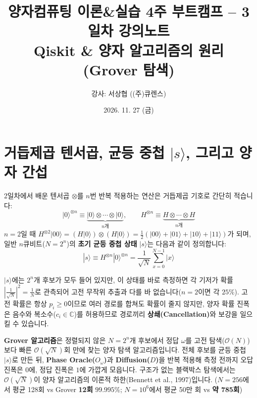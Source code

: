\documentclass[11pt, a4paper]{article}
\title{\textbf{양자컴퓨팅 이론\&실습 4주 부트캠프 -- 3일차 강의노트}\\
\large Qiskit \& 양자 알고리즘의 원리 (Grover 탐색)}
\author{강사: 서상협 ((주)큐렌스)}
\date{2026. 11. 27 (금)}
\newcommand{\ket}[1]{|#1\rangle}
\theoremstyle{definition}
\begin{document}
\maketitle
\tableofcontents
\vspace{0.5cm}

\section{거듭제곱 텐서곱, 균등 중첩 \texorpdfstring{$\ket{s}$}{|s>}, 그리고 양자 간섭}
2일차에서 배운 텐서곱 $\otimes$를 $n$번 반복 적용하는 연산은 거듭제곱 기호로 간단히 적습니다:
$$\ket{0}^{\otimes n} \equiv \underbrace{\ket{0}\otimes\cdots\otimes\ket{0}}_{n\text{개}}, \qquad H^{\otimes n} \equiv \underbrace{H\otimes\cdots\otimes H}_{n\text{개}}$$
$n=2$일 때 $H^{\otimes 2}\ket{00} = (H\ket{0})\otimes(H\ket{0}) = \frac{1}{2}(\ket{00}+\ket{01}+\ket{10}+\ket{11})$가 되며, 일반 $n$큐비트($N=2^n$)의 \textbf{초기 균등 중첩 상태} $\ket{s}$는 다음과 같이 정의합니다:
$$\ket{s} \equiv H^{\otimes n}\ket{0}^{\otimes n} = \frac{1}{\sqrt{N}}\sum_{x=0}^{N-1}\ket{x}$$

$\ket{s}$에는 $2^n$개 후보가 모두 들어 있지만, 이 상태를 바로 측정하면 각 기저가 확률 $\left|\frac{1}{\sqrt{N}}\right|^2 = \frac{1}{N}$로 관측되어 고전 무작위 추출과 다를 바 없습니다($n=2$이면 각 $25\%$). 고전 확률은 항상 $p_i \ge 0$이므로 여러 경로를 합쳐도 확률이 줄지 않지만, 양자 확률 진폭은 음수와 복소수($c_i \in \mathbb{C}$)를 허용하므로 경로끼리 \textbf{상쇄(Cancellation)}와 보강을 일으킬 수 있습니다.

\textbf{Grover 알고리즘}은 정렬되지 않은 $N=2^n$개 후보에서 정답 $\omega$를 고전 탐색($\mathcal{O}(N)$)보다 빠른 $\mathcal{O}(\sqrt{N})$회 만에 찾는 양자 탐색 알고리즘입니다. 전체 후보를 균등 중첩 $\ket{s}$로 만든 뒤, \textbf{Phase Oracle($O_\omega$)}과 \textbf{Diffusion($D$)}을 반복 적용해 측정 전까지 오답 진폭은 $0$에, 정답 진폭은 $1$에 가깝게 모읍니다. 구조가 없는 블랙박스 탐색에서는 $\mathcal{O}(\sqrt{N})$이 양자 알고리즘의 이론적 하한(Bennett et al., 1997)입니다. ($N=256$에서 평균 128회 vs Grover \textbf{12회} $99.995\%$; $N=10^6$에서 평균 50만 회 vs \textbf{약 785회})

\end{document}
